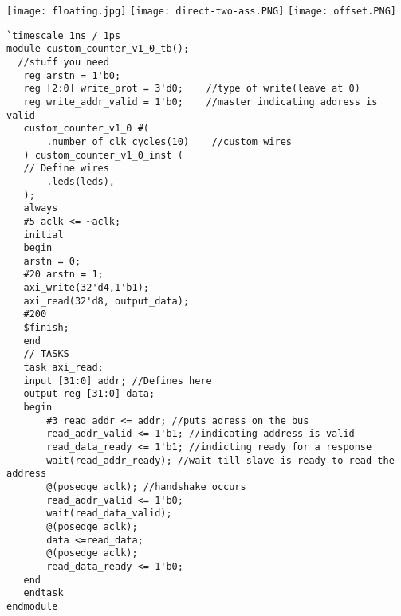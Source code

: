 \documentclass[12pt,landscape,a4paper]{article}
\begin{document}
\texttt{[image: floating.jpg]}
\texttt{[image: direct-two-ass.PNG]}
\texttt{[image: offset.PNG]}
\begin{tiny}
\begin{verbatim}
`timescale 1ns / 1ps
module custom_counter_v1_0_tb();
  //stuff you need
   reg arstn = 1'b0;
   reg [2:0] write_prot = 3'd0;    //type of write(leave at 0)
   reg write_addr_valid = 1'b0;    //master indicating address is valid
   custom_counter_v1_0 #(
       .number_of_clk_cycles(10)    //custom wires
   ) custom_counter_v1_0_inst (
   // Define wires
       .leds(leds),
   );
   always 
   #5 aclk <= ~aclk;
   initial 
   begin
   arstn = 0;
   #20 arstn = 1;
   axi_write(32'd4,1'b1);
   axi_read(32'd8, output_data);
   #200
   $finish; 
   end
   // TASKS
   task axi_read;
   input [31:0] addr; //Defines here
   output reg [31:0] data;
   begin
       #3 read_addr <= addr; //puts adress on the bus
       read_addr_valid <= 1'b1; //indicating address is valid
       read_data_ready <= 1'b1; //indicting ready for a response
       wait(read_addr_ready); //wait till slave is ready to read the address
       @(posedge aclk); //handshake occurs
       read_addr_valid <= 1'b0;
       wait(read_data_valid);
       @(posedge aclk);
       data <=read_data;
       @(posedge aclk);
       read_data_ready <= 1'b0;
   end
   endtask
endmodule
    \end{verbatim}
\end{tiny}
\end{document}
